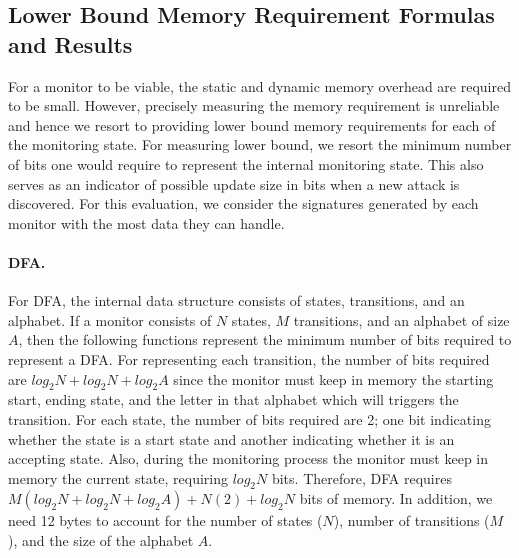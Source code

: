 \subsection{Lower Bound Memory Requirement Formulas and Results}
\label{app:lower_bound_memory}
For a monitor to be viable, the static and dynamic memory
overhead are required to be  small. However, precisely measuring
the memory requirement is unreliable and hence we resort to
providing lower bound memory requirements for each of the
monitoring state. For measuring lower bound, we resort the
minimum number of bits one would require to represent the internal
monitoring state. This also serves as an indicator of possible update
size in bits when a new attack is discovered.
For this evaluation, we consider the signatures generated by
each monitor with the most data they can handle.

\paragraph{DFA.} For DFA, the internal data structure consists of
states, transitions, and an alphabet. If a monitor consists of
$N$ states, $M$ transitions, and an alphabet of size $A$,
then the following functions represent the minimum number of bits
required to represent a DFA.
For representing each transition, the number of bits required are
$log_2N + log_2N + log_2A$ since the monitor must keep in memory
the starting start, ending state, and the letter in that alphabet
which will triggers the transition. For each state, the number of
bits required are 2; one bit indicating whether the state is a start state
and another indicating whether it is an accepting state.
Also, during the monitoring process the monitor must keep in memory
the current state, requiring $log_2N$ bits. Therefore, DFA
requires $M(log_2N + log_2N + log_2A) + N(2) + log_2N$ bits of memory.
In addition, we need 12 bytes to account for the number of states
($N$), number of transitions ($M$), and the size of the alphabet $A$.
